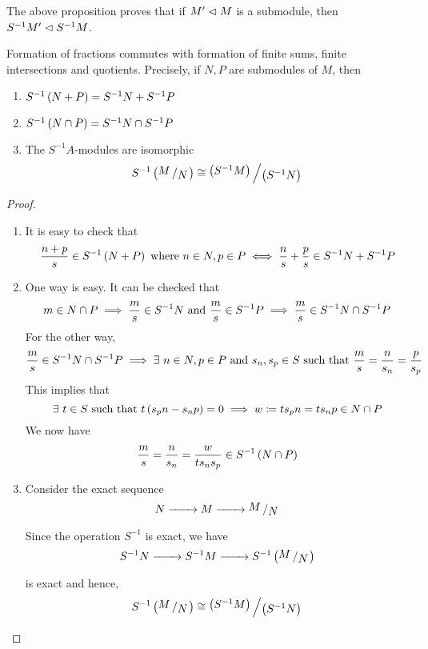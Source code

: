 The above proposition proves that if \(M' \vartriangleleft M\) is a submodule,
then \(S^{-1}M' \vartriangleleft S^{-1}M\).

\begin{corollary}{}{}
	Formation of fractions commutes with formation of finite
	sums, finite intersections and quotients.
	Precisely, if \(N, P\) are submodules of \(M\), then
	\begin{enumerate}
		\item \(S^{-1}\left( N + P \right) = S^{-1}N + S^{-1}P\)
		\item \(S^{-1}\left( N \cap P \right) = S^{-1}N \cap S^{-1}P\)
		\item The \(S^{-1}A\)-modules are isomorphic
		\[
			S^{-1}\brak{\bigslant{M}{N}} \cong
			\bigslant{\brak{S^{-1}M}}{\brak{S^{-1}N}}
		\]
	\end{enumerate}
\end{corollary}

\begin{proof} \

	\begin{enumerate}
		\item It is easy to check that
		\[
			\frac{n + p}{s} \in S^{-1}\left( N + P \right) \text{ where }
			n \in N, p \in P \iff \frac{n}{s} + \frac{p}{s}
			\in S^{-1}N + S^{-1}P
		\]

		\item One way is easy.
		It can be checked that
		\[
			m \in N \cap P \implies \frac{m}{s} \in S^{-1}N \text{ and }
			\frac{m}{s} \in S^{-1}P \implies \frac{m}{s} \in
			S^{-1}N \cap S^{-1}P
		\]
		For the other way,
		\[
			\frac{m}{s} \in S^{-1}N \cap S^{-1}P
			\implies \exists\ n \in N, p \in P \text{ and } s_n, s_p \in S
			\text{ such that } \frac{m}{s} = \frac{n}{s_n} = \frac{p}{s_p}
		\]
		This implies that
		\[
			\exists\ t \in S \text{ such that }
			t\left( s_p n - s_n p \right) = 0 \implies
			w \coloneqq t s_p n = t s_n p \in N \cap P
		\]
		We now have
		\[
			\frac{m}{s} = \frac{n}{s_n} =
			\frac{w}{ts_n s_p} \in S^{-1}\left( N \cap P \right)
		\]

		\item Consider the exact sequence
		\[
			N \xrightarrow[\quad\quad]{} M \xrightarrow[\quad\quad]{}
			\bigslant{M}{N}
		\]
		Since the operation \(S^{-1}\) is exact, we have
		\[
			S^{-1}N \xrightarrow[\quad\quad]{}
			S^{-1}M \xrightarrow[\quad\quad]{}
			S^{-1}\brak{\bigslant{M}{N}}
		\]
		is exact and hence,
		\[
			S^{-1}\brak{\bigslant{M}{N}} \cong
			\bigslant{\brak{S^{-1}M}}{\brak{S^{-1}N}}
		\]
	\end{enumerate}
\end{proof}

